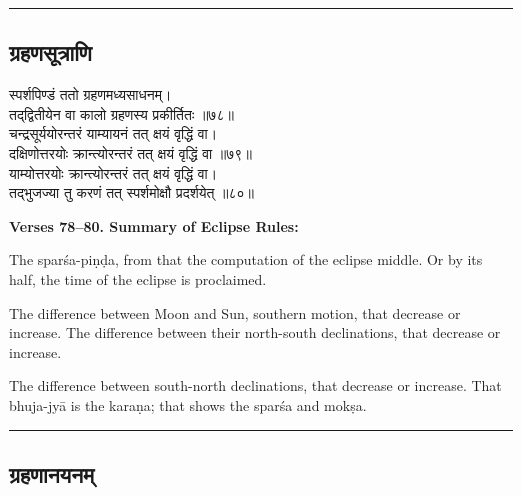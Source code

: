 \documentclass[11pt,a4paper]{article}
\newcommand{\longline}{\noindent\rule{\textwidth}{0.4pt}}
\newcommand{\dev}[1]{{\devanagarifont #1}}
\newcommand{\sectsep}{\par\vspace{0.8em}\longline\vspace{0.8em}}
\begin{document}
\sectsep

\subsection{\dev{ग्रहणसूत्राणि}}

\begin{minipage}[t]{0.48\textwidth}
\small\devanagarifont
स्पर्शपिण्डं ततो ग्रहणमध्यसाधनम्।\\
तद्‌द्वितीयेन वा कालो ग्रहणस्य प्रकीर्तितः ॥७८॥\\[0.5em]
चन्द्रसूर्ययोरन्तरं याम्यायनं तत् क्षयं वृद्धिं वा।\\
दक्षिणोत्तरयोः क्रान्त्योरन्तरं तत् क्षयं वृद्धिं वा ॥७९॥\\[0.5em]
याम्योत्तरयोः क्रान्त्योरन्तरं तत् क्षयं वृद्धिं वा।\\
तद्‌भुजज्या तु करणं तत् स्पर्शमोक्षौ प्रदर्शयेत् ॥८०॥
\end{minipage}%
\hfill
\begin{minipage}[t]{0.48\textwidth}
\small
\textbf{Verses 78--80. Summary of Eclipse Rules:}

The spar\'sa-pi\d{n}\d{d}a, from that the computation of the eclipse middle. Or by its half, the time of the eclipse is proclaimed.

The difference between Moon and Sun, southern motion, that decrease or increase. The difference between their north-south declinations, that decrease or increase.

The difference between south-north declinations, that decrease or increase. That bhuja-jy\=a is the kara\d{n}a; that shows the spar\'sa and mok\d{s}a.
\end{minipage}

\sectsep

\subsection{\dev{ग्रहणानयनम्}}
\end{document}
